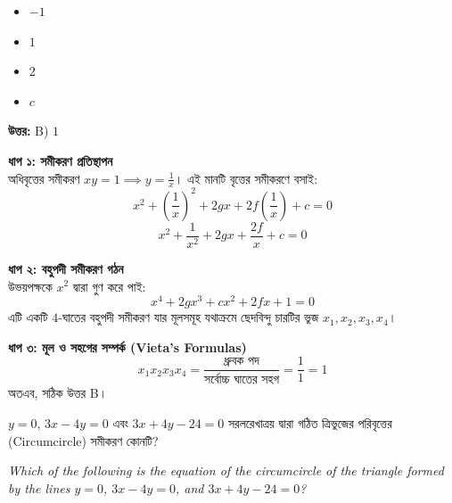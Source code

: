 \documentclass[12pt, a4paper]{article}
\begin{document}
\begin{itemize}[label={}, leftmargin=1cm, itemsep=0.5em]
    \item[\textbf{A)}] $-1$
    \item[\textbf{B)}] $1$
    \item[\textbf{C)}] $2$
    \item[\textbf{D)}] $c$
\end{itemize}

\vspace{0.5em}
\begin{tcolorbox}[answerbox]
    \textbf{\color{success} উত্তর:} B) $1$
\end{tcolorbox}
\vspace{1em}

\begin{tcolorbox}[solutionbox={সমাধান (Solution)}]
    \noindent
    \textbf{ধাপ ১: সমীকরণ প্রতিস্থাপন} \\
    অধিবৃত্তের সমীকরণ $xy = 1 \implies y = \frac{1}{x}$। এই মানটি বৃত্তের সমীকরণে বসাই:
    \[ x^2 + \left(\frac{1}{x}\right)^2 + 2gx + 2f\left(\frac{1}{x}\right) + c = 0 \]
    \[ x^2 + \frac{1}{x^2} + 2gx + \frac{2f}{x} + c = 0 \]
    
    \vspace{0.5em}
    \noindent\textbf{ধাপ ২: বহুপদী সমীকরণ গঠন} \\
    উভয়পক্ষকে $x^2$ দ্বারা গুণ করে পাই:
    \[ x^4 + 2gx^3 + cx^2 + 2fx + 1 = 0 \]
    এটি একটি $4$-ঘাতের বহুপদী সমীকরণ যার মূলসমূহ যথাক্রমে ছেদবিন্দু চারটির ভুজ $x_1, x_2, x_3, x_4$।
    
    \vspace{0.5em}
    \noindent\textbf{ধাপ ৩: মূল ও সহগের সম্পর্ক (Vieta's Formulas)} \\
    \[ x_1 x_2 x_3 x_4 = \frac{\text{ধ্রুবক পদ}}{\text{সর্বোচ্চ ঘাতের সহগ}} = \frac{1}{1} = 1 \]
    অতএব, সঠিক উত্তর B।
\end{tcolorbox}

\begin{tcolorbox}[questionbox={প্রশ্ন (Question) 23}]
    \noindent
    $y = 0$, $3x - 4y = 0$ এবং $3x + 4y - 24 = 0$ সরলরেখাত্রয় দ্বারা গঠিত ত্রিভুজের পরিবৃত্তের (Circumcircle) সমীকরণ কোনটি?
    
    \vspace{0.8em}
    \begin{english}
    \noindent\textit{\color{darkgray}
    Which of the following is the equation of the circumcircle of the triangle formed by the lines $y = 0$, $3x - 4y = 0$, and $3x + 4y - 24 = 0$?
    }
    \end{english}
\end{tcolorbox}
\end{document}
